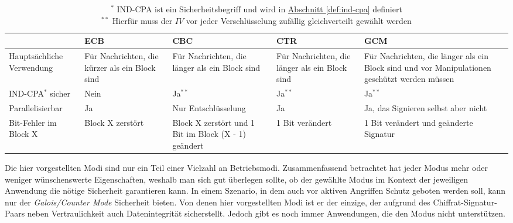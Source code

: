 \begin{table}[h]
\centering
	\begin{tabularx}{\textwidth}{ | X | X | X | X | X |} 
		\hline
		  & ECB & CBC & CTR & GCM \\ 
		\hline
		Hauptsächliche Verwendung & Für Nachrichten, die kürzer als ein Block sind & Für Nachrichten, die länger als ein Block sind 
		& Für Nachrichten, die länger als ein Block sind & Für Nachrichten, die länger als ein Block sind und vor Manipulationen geschützt werden müssen \\ 
		\hline
		\parbox{3cm}{IND-CPA\(^{\ast}\) } sicher & Nein & Ja\(^{\ast\ast}\) & Ja\(^{\ast\ast}\) & Ja\(^{\ast\ast}\) \\
		\hline
		 Parallelisierbar & Ja & Nur Entschlüsselung  & Ja & Ja, das Signieren selbst aber nicht \\ 
		\hline
		Bit-Fehler im Block X & Block X zerstört & Block X zerstört und 1 Bit im Block (X - 1) geändert 
		& 1 Bit verändert & 1 Bit verändert und geänderte Signatur \\
		\hline
	\end{tabularx}
	\caption{\(^{\ast}\) IND-CPA ist ein Sicherheitsbegriff und wird in \hyperref[def:ind-cpa]{Abschnitt \ref{def:ind-cpa}} definiert \\ 
		\(^{\ast\ast}\) Hierfür muss der \(IV\) vor jeder Verschlüsselung zufällig gleichverteilt gewählt werden}
\end{table}

\captionsetup[table]{labelformat=default}
\captionsetup[table]{singlelinecheck=true}
\captionsetup{font=normal}
 
\bigskip

Die hier vorgestellten Modi sind nur ein Teil einer Vielzahl an Betriebsmodi. Zusammenfassend betrachtet hat jeder Modus mehr oder weniger wünschenswerte Eigenschaften, weshalb man sich gut überlegen sollte, ob der gewählte Modus im Kontext der jeweiligen Anwendung die nötige Sicherheit garantieren kann. In einem Szenario, in dem auch vor aktiven Angriffen Schutz geboten werden soll,
kann nur der \textit{Galois/Counter Mode} Sicherheit bieten. Von denen hier vorgestellten Modi ist er der einzige, der aufgrund des Chiffrat-Signatur-Paars neben Vertraulichkeit auch Datenintegrität sicherstellt. Jedoch gibt es noch immer Anwendungen, die den Modus
nicht unterstützen.

